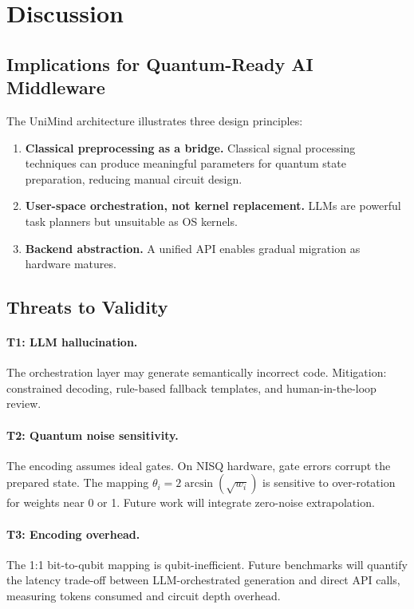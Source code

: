 ﻿\documentclass[12pt,a4paper]{article}
\begin{document}
\section{Discussion}\label{sec:discussion}

\subsection{Implications for Quantum-Ready AI Middleware}

The UniMind architecture illustrates three design principles:

\begin{enumerate}[leftmargin=2em]
    \item \textbf{Classical preprocessing as a bridge.} Classical signal processing techniques can produce meaningful parameters for quantum state preparation, reducing manual circuit design.
    \item \textbf{User-space orchestration, not kernel replacement.} LLMs are powerful task planners but unsuitable as OS kernels.
    \item \textbf{Backend abstraction.} A unified API enables gradual migration as hardware matures.
\end{enumerate}

\subsection{Threats to Validity}\label{sec:threats}

\paragraph{T1: LLM hallucination.} The orchestration layer may generate semantically incorrect code. Mitigation: constrained decoding, rule-based fallback templates, and human-in-the-loop review.

\paragraph{T2: Quantum noise sensitivity.} The encoding assumes ideal gates. On NISQ hardware, gate errors corrupt the prepared state. The mapping $\theta_i = 2\arcsin(\sqrt{w_i})$ is sensitive to over-rotation for weights near 0 or 1. Future work will integrate zero-noise extrapolation.

\paragraph{T3: Encoding overhead.} The 1:1 bit-to-qubit mapping is qubit-inefficient. Future benchmarks will quantify the latency trade-off between LLM-orchestrated generation and direct API calls, measuring tokens consumed and circuit depth overhead.
\end{document}
